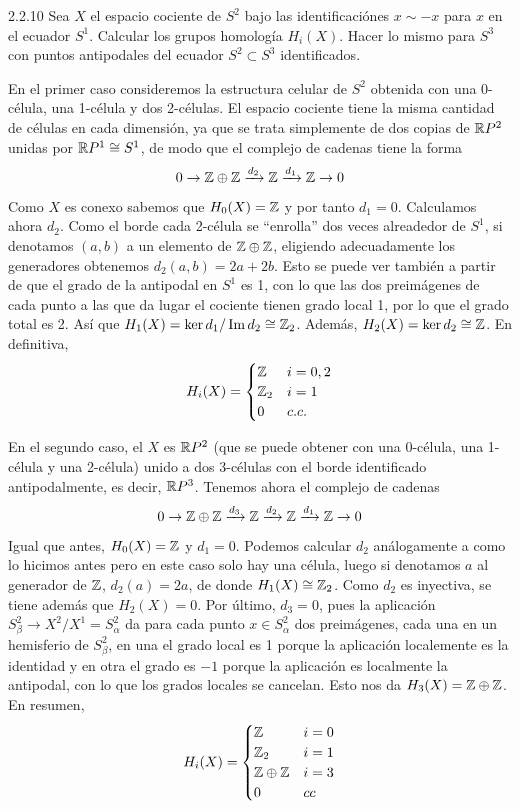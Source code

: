 \documentclass[twoside]{article}
\begin{document}
\begin{ejercicio}{2.2.10}
Sea $X$ el espacio cociente de $S^2$ bajo las identificaciónes $x\sim-x$ para $x$ en el ecuador $S^1$. Calcular los grupos homología $H_i(X)$. Hacer lo mismo para $S^3$ con puntos antipodales del ecuador $S^2\subset S^3$ identificados. 
\end{ejercicio}
\begin{solucion}
En el primer caso consideremos la estructura celular de $S^2$ obtenida con una 0-célula, una 1-célula y dos 2-células. El espacio cociente tiene la misma cantidad de células en cada dimensión, ya que se trata simplemente de dos copias de $\mathbb{R} P^2$ unidas por $\mathbb{R} P^1\cong S^1$, de modo que el complejo de cadenas tiene la forma
\[
0\to \mathbb{Z}\oplus\mathbb{Z}\xrightarrow{d_2}\mathbb{Z}\xrightarrow{d_1}\mathbb{Z}\to 0
\]
Como $X$ es conexo sabemos que $H_0(X)=\mathbb{Z}$ y por tanto $d_1=0$. Calculamos ahora $d_2$. Como el borde cada 2-célula se ``enrolla'' dos veces alreadedor de $S^1$, si denotamos $(a,b)$ a un elemento de $\mathbb{Z}\oplus\mathbb{Z}$, eligiendo adecuadamente los generadores obtenemos $d_2(a,b)=2a+2b$. Esto se puede ver también a partir de que el grado de la antipodal en $S^1$ es 1, con lo que las dos preimágenes de cada punto a las que da lugar el cociente tienen grado local 1, por lo que el grado total es 2. Así que $H_1(X)=\ker{d_1}/\operatorname{Im}{d_2}\cong\mathbb{Z}_2$. Además, $H_2(X)=\ker{d_2}\cong\mathbb{Z}$. En definitiva,
\[
H_i(X)=\begin{cases}
\mathbb{Z} & i=0,2\\
\mathbb{Z}_2 & i=1\\
0 & c.c.
\end{cases}
\]

En el segundo caso, el $X$ es $\mathbb{R} P^2$ (que se puede obtener con una 0-célula, una 1-célula y una 2-célula) unido a dos 3-células con el borde identificado antipodalmente, es decir, $\mathbb{R} P^3$. Tenemos ahora el complejo de cadenas
\[
0\to\mathbb{Z}\oplus\mathbb{Z}\xrightarrow{d_3}\mathbb{Z}\xrightarrow{d_2}\mathbb{Z}\xrightarrow{d_1}\mathbb{Z}\to 0
\]
Igual que antes, $H_0(X)=\mathbb{Z}$ y $d_1=0$. Podemos calcular $d_2$ análogamente a como lo hicimos antes pero en este caso solo hay una célula, luego si denotamos $a$ al generador de $\mathbb{Z}$, $d_2(a)=2a$, de donde $H_1(X)\cong\mathbb{Z}_2$. Como $d_2$ es inyectiva, se tiene además que $H_2(X)=0$. Por último, $d_3=0$, pues la aplicación $S^2_{\beta}\to X^2/X^1=S^2_{\alpha}$ da para cada punto $x\in S^2_{\alpha}$ dos preimágenes, cada una en un hemisferio de $S^2_{\beta}$, en una el grado local es 1 porque la aplicación localemente es la identidad y en otra el grado es $-1$ porque la aplicación es localmente la antipodal, con lo que los grados locales se cancelan. Esto nos da $H_3(X)=\mathbb{Z}\oplus\mathbb{Z}$. En resumen,
\[
H_i(X)=\begin{cases}
\mathbb{Z} & i=0\\
\mathbb{Z}_2 & i=1\\
\mathbb{Z}\oplus\mathbb{Z} & i=3\\
0 & cc
\end{cases}
\]
\end{solucion}
\end{document}
